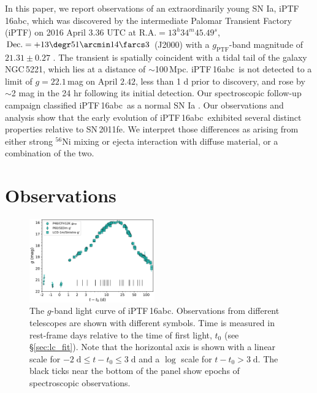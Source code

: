 \documentclass[twocolumn]{aastex61}
\newcommand{\abc}{iPTF\,16abc}
\begin{document}
In this paper, we report observations of an extraordinarily young SN Ia, \abc, which was discovered by the intermediate Palomar Transient Factory (iPTF) on 2016 April $3.36$ UTC at $\textrm{R.A.}=13^h34^m45.49^s$, $\textrm{Dec.}=+13\degr51\arcmin14\farcs3$ (J2000) with a $g_\mathrm{PTF}$-band magnitude of $21.31\pm0.27$ \citep{2016ATel.8907....1M}. The transient is spatially coincident with a tidal tail of the galaxy NGC\,5221, which lies at a distance of $\sim$100\,Mpc. \abc\ is not detected to a limit of $g=22.1$\,mag on April $2.42$, less than 1 d prior to discovery, and rose by $\sim$2 mag in the 24 hr following its initial detection. Our spectroscopic follow-up
campaign classified \abc\ as a normal SN Ia
\citep{2016ATel.8909....1C}. Our observations and analysis show that the early evolution of \abc\ exhibited several distinct properties relative to SN\,2011fe. We interpret those differences as arising from either strong $^{56}$Ni mixing or ejecta interaction with diffuse material, or a combination of the two.


\section{Observations}
\label{sec:obs}

\begin{figure}[htb]
  \centering
  \includegraphics[width=0.48\textwidth]{logLC_with_colors.pdf}
  \caption{The $g$-band
  light curve of \abc. Observations from different 
  telescopes are shown with different symbols. Time is measured in 
  rest-frame days relative to the time of first light, $t_0$ (see 
  \S\ref{sec:lc_fit}). Note that the horizontal axis is shown with 
  a linear scale for $-2 \; \mathrm{d} \le t - t_0 \le 3 \; 
  \mathrm{d}$ and a $\log$ scale for $t - t_0 > 3 \; \mathrm{d}$. 
  The black ticks near the
  bottom of the panel show epochs of spectroscopic observations.
  }
  \label{fig:lightcurve}
\end{figure}
\end{document}

